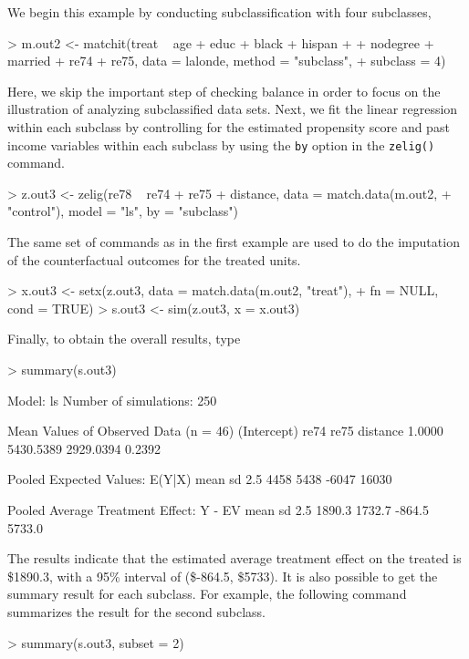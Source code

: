 \begin{enumerate}
  We begin this example by conducting subclassification with four subclasses,
\begin{Schunk}
\begin{Sinput}
> m.out2 <- matchit(treat ~ age + educ + black + hispan + 
+     nodegree + married + re74 + re75, data = lalonde, method = "subclass", 
+     subclass = 4)
\end{Sinput}
\end{Schunk}
Here, we skip the important step of checking balance in order to focus
on the illustration of analyzing subclassified data sets.  Next, we
fit the linear regression within each subclass by controlling for the
estimated propensity score and past income variables within each
subclass by using the {\tt by} option in the {\tt zelig()} command. 
\begin{Schunk}
\begin{Sinput}
> z.out3 <- zelig(re78 ~ re74 + re75 + distance, data = match.data(m.out2, 
+     "control"), model = "ls", by = "subclass")
\end{Sinput}
\end{Schunk}
The same set of commands as in the first example are used to
do the imputation of the counterfactual outcomes for the treated
units.
\begin{Schunk}
\begin{Sinput}
> x.out3 <- setx(z.out3, data = match.data(m.out2, "treat"), 
+     fn = NULL, cond = TRUE)
> s.out3 <- sim(z.out3, x = x.out3)
\end{Sinput}
\end{Schunk}
Finally, to obtain the overall results, type
\begin{Schunk}
\begin{Sinput}
> summary(s.out3)
\end{Sinput}
\begin{Soutput}

  Model: ls 
  Number of simulations: 250 

Mean Values of Observed Data (n = 46) 
(Intercept)        re74        re75    distance 
     1.0000   5430.5389   2929.0394      0.2392 

Pooled Expected Values: E(Y|X)
 mean    sd  2.5% 97.5% 
 4458  5438 -6047 16030 

Pooled Average Treatment Effect: Y - EV
  mean     sd   2.5%  97.5% 
1890.3 1732.7 -864.5 5733.0 

\end{Soutput}
\end{Schunk}
The results indicate that the estimated average treatment effect on
the treated is
\$1890.3,
with a 95\% interval of
(\$-864.5,
\$5733).
It is also possible to get the summary result for each subclass. For
example, the following command summarizes the result for the second
subclass.
\begin{Schunk}
\begin{Sinput}
> summary(s.out3, subset = 2)
\end{Sinput}
\begin{Soutput}


\end{Soutput}
\end{Schunk}
\end{enumerate}
